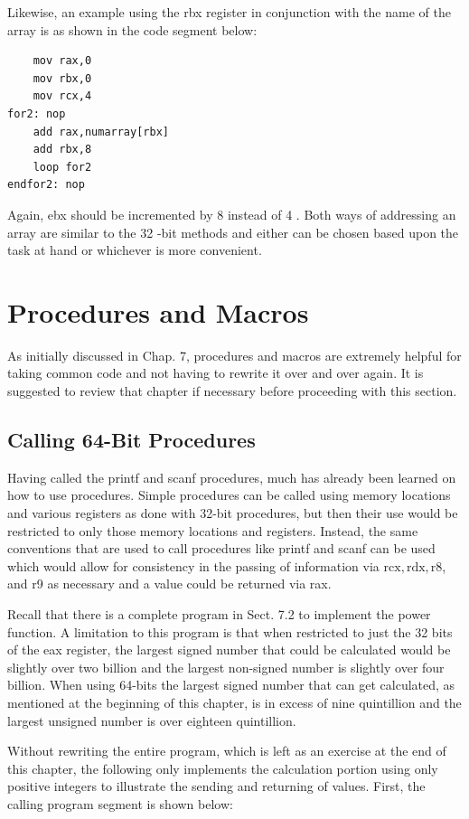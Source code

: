 \documentclass[10pt]{book}
\begin{document}
Likewise, an example using the rbx register in conjunction with the name of the array is as shown in the code segment below:

\begin{verbatim}
    mov rax,0
    mov rbx,0
    mov rcx,4
for2: nop
    add rax,numarray[rbx]
    add rbx,8
    loop for2
endfor2: nop
\end{verbatim}

Again, ebx should be incremented by 8 instead of 4 . Both ways of addressing an array are similar to the 32 -bit methods and either can be chosen based upon the task at hand or whichever is more convenient.

\section{Procedures and Macros}
As initially discussed in Chap. 7, procedures and macros are extremely helpful for taking common code and not having to rewrite it over and over again. It is suggested to review that chapter if necessary before proceeding with this section.

\subsection{Calling 64-Bit Procedures}
Having called the printf and scanf procedures, much has already been learned on how to use procedures. Simple procedures can be called using memory locations and various registers as done with 32-bit procedures, but then their use would be restricted to only those memory locations and registers. Instead, the same conventions that are used to call procedures like printf and scanf can be used which would allow for consistency in the passing of information via $\mathrm{rcx}, \mathrm{rdx}, \mathrm{r} 8$, and r9 as necessary and a value could be returned via rax.


Recall that there is a complete program in Sect. 7.2 to implement the power function. A limitation to this program is that when restricted to just the 32 bits of the eax register, the largest signed number that could be calculated would be slightly over two billion and the largest non-signed number is slightly over four billion. When using 64-bits the largest signed number that can get calculated, as mentioned at the beginning of this chapter, is in excess of nine quintillion and the largest unsigned number is over eighteen quintillion.

Without rewriting the entire program, which is left as an exercise at the end of this chapter, the following only implements the calculation portion using only positive integers to illustrate the sending and returning of values. First, the calling program segment is shown below:
\end{document}
